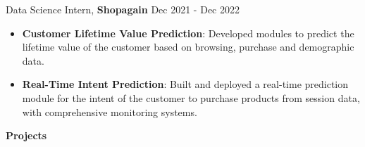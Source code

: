 \documentclass{article}%
\begin{document}
\pagebreak
\noindent Data Science Intern, \textbf{Shopagain} \hfill{Dec 2021 - Dec 2022}
\vspace{-1mm}


\begin{itemize}
\setlength\itemsep{0.01em}
\item \textbf{Customer Lifetime Value Prediction}: Developed modules to predict the lifetime value of the customer based on browsing, purchase and demographic data.
    \item \textbf{Real-Time Intent Prediction}: Built and deployed a real-time prediction module for the intent of the customer to purchase products from session data, with comprehensive monitoring systems.
\end{itemize}


\begin{flushleft}
\bf{\Large{Projects}}
\end{flushleft}
\vspace{-2mm}
\hline
\vspace{2mm}
\end{document}
